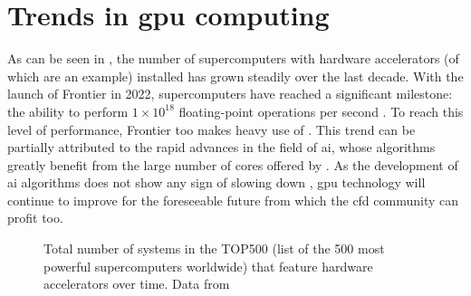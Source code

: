 \section{Trends in \acrshort{gpu} computing}
As can be seen in , the number of supercomputers with hardware accelerators (of which  are an example) installed has grown steadily over the last decade. With the launch of Frontier in 2022, supercomputers have reached a significant milestone: the ability to perform $1\times10^{18}$ floating-point operations per second \citep{choiBeatingHartWorld2022}. To reach this level of performance, Frontier too makes heavy use of . This trend can be partially attributed to the rapid advances in the field of \acrfull{ai}, whose algorithms greatly benefit from the large number of cores offered by  \citep{mittalSurveyTechniquesOptimizing2019}. As the development of \acrshort{ai} algorithms does not show any sign of slowing down \citep{xuArtificialIntelligencePowerful2021}, \acrshort{gpu} technology will continue to improve for the foreseeable future from which the \acrshort{cfd} community can profit too. 

\begin{figure}[h!]
    \centering
    
    \caption{Total number of systems in the TOP500 (list of the 500 most powerful supercomputers worldwide) that feature hardware accelerators over time. Data from \citet{top500TOP500Lists2023}}
    \label{fig:top500_gpus}
\end{figure}
